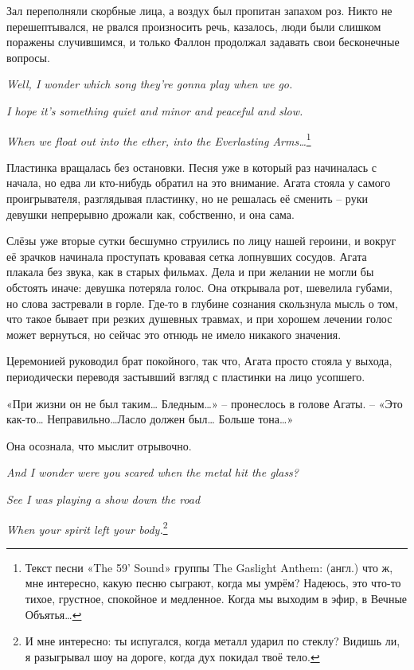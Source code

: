 \documentclass[
  a5paperpaper,
  DIV=11,
  numbers=noendperiod]{scrreprt}
\begin{document}
Зал переполняли скорбные лица, а воздух был пропитан запахом роз. Никто
не перешептывался, не рвался произносить речь, казалось, люди были
слишком поражены случившимся, и только Фаллон продолжал задавать свои
бесконечные вопросы.

\emph{Well, I wonder which song they're gonna play when we go.}

\emph{I hope it's something quiet and minor and peaceful and slow.}

\emph{When we float out into the ether, into the Everlasting
Arms\ldots{}}\footnote{Текст песни «The 59' Sound» группы The Gaslight
  Anthem: (англ.) что ж, мне интересно, какую песню сыграют, когда мы
  умрём? Надеюсь, это что-то тихое, грустное, спокойное и медленное.
  Когда мы выходим в эфир, в Вечные Объятья\ldots{}}

Пластинка вращалась без остановки. Песня уже в который раз начиналась с
начала, но едва ли кто-нибудь обратил на это внимание. Агата стояла у
самого проигрывателя, разглядывая пластинку, но не решалась её сменить
-- руки девушки непрерывно дрожали как, собственно, и она сама.

Слёзы уже вторые сутки бесшумно струились по лицу нашей героини, и
вокруг её зрачков начинала проступать кровавая сетка лопнувших сосудов.
Агата плакала без звука, как в старых фильмах. Дела и при желании не
могли бы обстоять иначе: девушка потеряла голос. Она открывала рот,
шевелила губами, но слова застревали в горле. Где-то в глубине сознания
скользнула мысль о том, что такое бывает при резких душевных травмах, и
при хорошем лечении голос может вернуться, но сейчас это отнюдь не имело
никакого значения.

Церемонией руководил брат покойного, так что, Агата просто стояла у
выхода, периодически переводя застывший взгляд с пластинки на лицо
усопшего.

«При жизни он не был таким\ldots{} Бледным\ldots» -- пронеслось в голове
Агаты. -- «Это как-то\ldots{} Неправильно\ldots Ласло должен был\ldots{}
Больше тона\ldots»

Она осознала, что мыслит отрывочно.

\emph{And I wonder were you scared when the metal hit the glass?}

\emph{See I was playing a show down the road}

\emph{When your spirit left your body.}\footnote{И мне интересно: ты
  испугался, когда металл ударил по стеклу? Видишь ли, я разыгрывал шоу
  на дороге, когда дух покидал твоё тело.}
\end{document}

